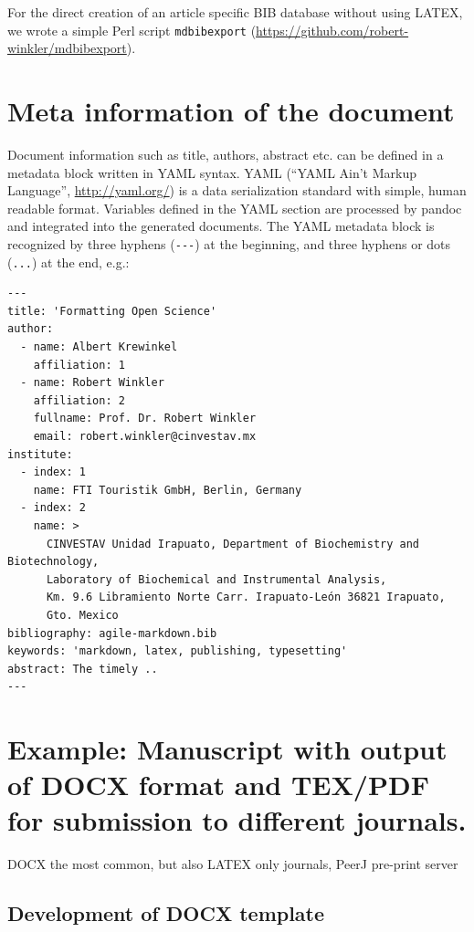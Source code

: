 \documentclass[10pt,fleqn]{wlpeerj}
\begin{document}
For
the
direct
creation
of an
article
specific
BIB
database
without
using
LATEX,
we
wrote
a
simple
Perl
script
\texttt{mdbibexport}
(\url{https://github.com/robert-winkler/mdbibexport}).

\section{Meta
information
of
the
document}\label{meta-information-of-the-document}

Document
information
such
as
title,
authors,
abstract
etc.
can
be
defined
in a
metadata
block
written
in
YAML
syntax.
YAML
(``YAML
Ain't
Markup
Language'',
\url{http://yaml.org/})
is a
data
serialization
standard
with
simple,
human
readable
format.
Variables
defined
in
the
YAML
section
are
processed
by
pandoc
and
integrated
into
the
generated
documents.
The
YAML
metadata
block
is
recognized
by
three
hyphens
(\texttt{-\/-\/-})
at
the
beginning,
and
three
hyphens
or
dots
(\texttt{...})
at
the
end,
e.g.:

\begin{verbatim}
---
title: 'Formatting Open Science'
author:
  - name: Albert Krewinkel
    affiliation: 1
  - name: Robert Winkler
    affiliation: 2
    fullname: Prof. Dr. Robert Winkler
    email: robert.winkler@cinvestav.mx
institute:
  - index: 1
    name: FTI Touristik GmbH, Berlin, Germany
  - index: 2
    name: >
      CINVESTAV Unidad Irapuato, Department of Biochemistry and Biotechnology,
      Laboratory of Biochemical and Instrumental Analysis,
      Km. 9.6 Libramiento Norte Carr. Irapuato-León 36821 Irapuato,
      Gto. Mexico
bibliography: agile-markdown.bib
keywords: 'markdown, latex, publishing, typesetting'
abstract: The timely ..
---
\end{verbatim}

\section{Example:
Manuscript
with
output
of
DOCX
format
and
TEX/PDF
for
submission
to
different
journals.}\label{example-manuscript-with-output-of-docx-format-and-texpdf-for-submission-to-different-journals.}

DOCX
the
most
common,
but
also
LATEX
only
journals,
PeerJ
pre-print
server

\subsection{Development
of
DOCX
template}\label{development-of-docx-template}
\end{document}
